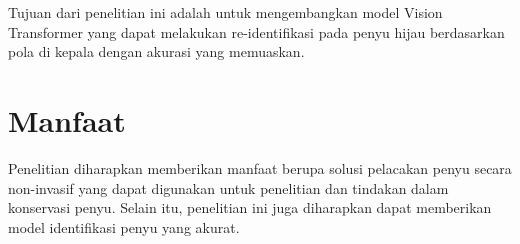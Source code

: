 Tujuan dari penelitian ini adalah untuk mengembangkan model Vision Transformer yang dapat melakukan re-identifikasi pada penyu hijau berdasarkan pola di kepala dengan akurasi yang memuaskan.

\section{Manfaat}

Penelitian diharapkan memberikan manfaat berupa solusi pelacakan penyu secara non-invasif yang dapat digunakan untuk penelitian dan tindakan dalam konservasi penyu. 
Selain itu, penelitian ini juga diharapkan dapat memberikan model identifikasi penyu yang akurat.
